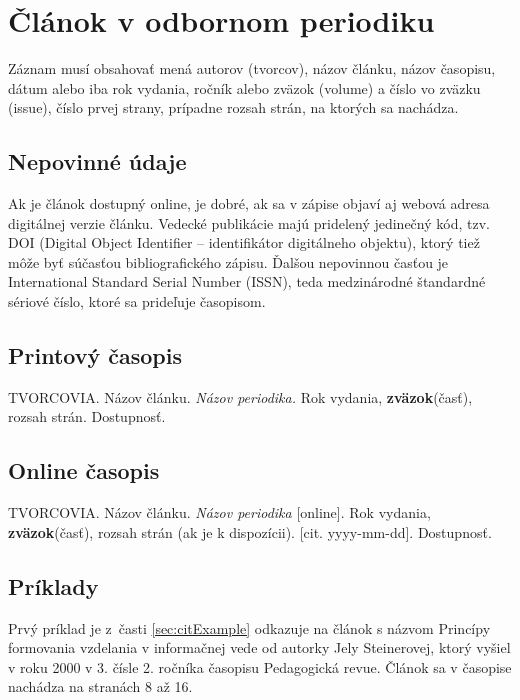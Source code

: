 \section{Článok v odbornom periodiku}
Záznam musí obsahovať mená autorov (tvorcov), názov článku, názov časopisu, dátum alebo iba rok vydania, ročník alebo zväzok (volume) a číslo vo zväzku (issue), číslo prvej strany, prípadne rozsah strán, na ktorých sa nachádza.

\subsection*{\normalsize Nepovinné údaje}
Ak je článok dostupný online, je dobré, ak sa v zápise objaví aj webová adresa digitálnej verzie článku. Vedecké publikácie majú pridelený jedinečný kód, tzv. DOI (Digital Object Identifier – identifikátor digitálneho objektu), ktorý tiež môže byť súčasťou bibliografického zápisu. Ďalšou nepovinnou časťou je International Standard Serial Number (ISSN), teda medzinárodné štandardné sériové číslo, ktoré sa prideľuje časopisom.

\subsection*{\normalsize Printový časopis}
\begin{trivlist}
\item TVORCOVIA. Názov článku. \textit{Názov periodika.} Rok vydania, \textbf{zväzok}(časť), rozsah strán. Dostupnosť.
\end{trivlist}

\subsection*{\normalsize Online časopis}
\begin{trivlist}
\item TVORCOVIA. Názov článku. \textit{Názov periodika} [online]. Rok vydania, \textbf{zväzok}(časť), rozsah strán (ak je k dispozícii). [cit. yyyy-mm-dd]. Dostupnosť.
\end{trivlist}

\subsection*{\normalsize Príklady}
Prvý príklad je z~časti
\ref{sec:citExample} odkazuje na článok s názvom Princípy formovania vzdelania v informačnej vede od autorky Jely Steinerovej, ktorý vyšiel v roku 2000 v 3. čísle 2. ročníka časopisu Pedagogická revue. Článok sa v časopise nachádza na stranách 8 až 16.


